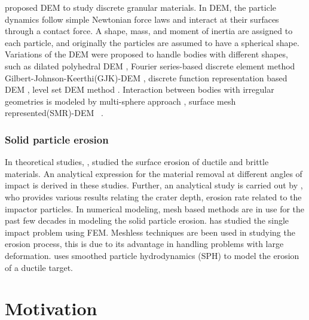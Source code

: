 \cite{cundall_discrete_1979} proposed DEM to study discrete granular materials.
In DEM, the particle dynamics follow simple Newtonian force laws and interact at
their surfaces through a contact force. A shape, mass, and moment of inertia are
assigned to each particle, and originally the particles are assumed to have a
spherical shape. Variations of the DEM were proposed to handle bodies with
different shapes, such as dilated polyhedral DEM \cite{liu_new_2020}, Fourier
series-based discrete element method \cite{lai_fourier_2020}
Gilbert-Johnson-Keerthi(GJK)-DEM \citep{wachs2012grains3d}, discrete function
representation based DEM \citep{lu2012critical}, level set DEM method
\citep{duriez2021precision}. Interaction between bodies with irregular
geometries is modeled by multi-sphere approach \citep{kruggel-emden_study_2008},
surface mesh represented(SMR)-DEM ~\cite{zhan2021surface}.


\subsubsection*{Solid particle erosion}

In theoretical studies, \cite{finnie1972some}, \cite{bitter1963study}
studied the surface erosion of ductile and brittle materials. An analytical
expression for the material removal at different angles of impact is derived in
these studies. Further, an analytical study is carried out by
\cite{hutchings1977erosion}, who provides various results relating the
crater depth, erosion rate related to the impactor particles. In numerical
modeling, mesh based methods are in use for the past few decades in modeling the
solid particle erosion. \cite{molinari2002study,takaffoli2009finite} has
studied the single impact problem using FEM. Meshless techniques are been used
in studying the erosion process, this is due to its advantage in handling
problems with large deformation. \cite{dong2016smoothed} uses smoothed
particle hydrodynamics (SPH) to model the erosion of a ductile target.


\section{Motivation}

